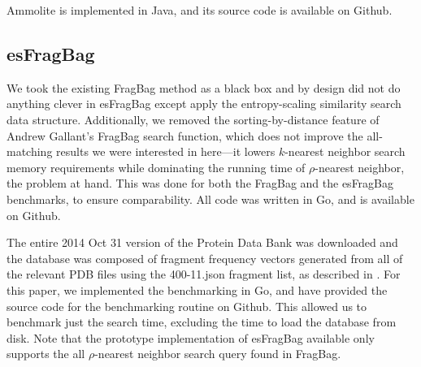\documentclass[review,preprint,12pt]{elsarticle}
\theoremstyle{definition}
\theoremstyle{remark}
\begin{document}
Ammolite is implemented in Java, and its source code is available on Github.

\subsection{esFragBag}
We took the existing FragBag method as a black box and by design did not do anything clever in esFragBag except apply the entropy-scaling similarity search data structure.
Additionally, we removed the sorting-by-distance feature of Andrew Gallant's 
FragBag search function, which does not improve the all-matching results we 
were interested in here---it lowers $k$-nearest neighbor search memory 
requirements while dominating the running time of $\rho$-nearest neighbor, the 
problem at hand.
This was done for both the FragBag and the esFragBag benchmarks, to ensure comparability.
All code was written in Go, and is available on Github.

The entire 2014 Oct 31 version of the Protein Data Bank was downloaded and the 
database was composed of fragment frequency vectors generated from all of the 
relevant PDB files using the 400-11.json fragment list, as described in \citep{budowski2010fragbag}.
For this paper, we implemented the benchmarking in Go, and have provided the 
source code for the benchmarking routine on Github.
This allowed us to benchmark just the search time, excluding the time to load the database from disk.
Note that the prototype implementation of esFragBag available only supports the 
all $\rho$-nearest neighbor search query found in FragBag.


%

\end{document}

